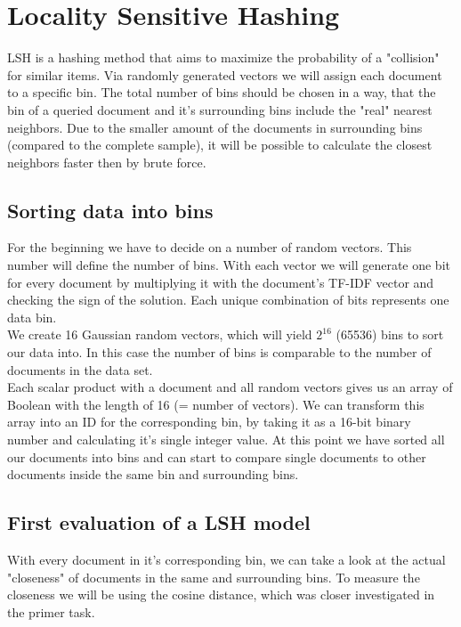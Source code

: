 \documentclass[12pt]{scrreprt}
\begin{document}
\chapter{Locality Sensitive Hashing}

LSH is a hashing method that aims to maximize the probability of a "collision" for similar items. Via randomly generated vectors we will assign each document to a specific bin. The total number of bins should be chosen in a way, that the bin of a queried document and it's surrounding bins include the "real" nearest neighbors. Due to the smaller amount of the documents in surrounding bins (compared to the complete sample), it will be possible to calculate the closest neighbors faster then by brute force.\\


\section{Sorting data into bins}
For the beginning we have to decide on a number of random vectors. This number will define the number of bins. With each vector we will generate one bit for every document by multiplying it with the document's TF-IDF vector and checking the sign of the solution. Each unique combination of bits represents one data bin.\\

We create 16 Gaussian random vectors, which will yield $2^{16}$ (65536) bins to sort our data into. In this case the number of bins is comparable to the number of documents in the data set.\\

Each scalar product with a document and all random vectors gives us an array of Boolean with the length of 16 (= number of vectors). We can transform this array into an ID for the corresponding bin, by taking it as a 16-bit binary number and calculating it's single integer value. At this point we have sorted all our documents into bins and can start to compare single documents to other documents inside the same bin and surrounding bins.\\

\newpage
\section{First evaluation of a LSH model}
With every document in it's corresponding bin, we can take a look at the actual "closeness" of documents in the same and surrounding bins. To measure the closeness we will be using the cosine distance, which was closer investigated in the primer task.\\
\end{document}
